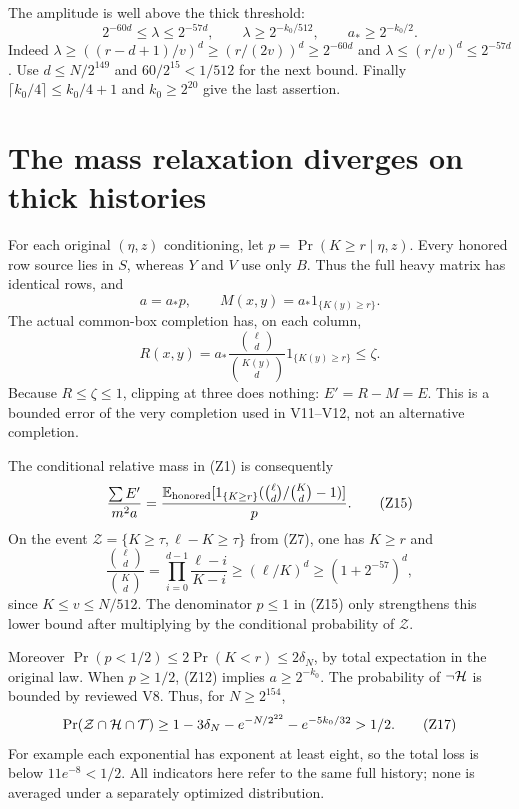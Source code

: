 \documentclass[11pt]{article}
\newcommand{\E}{\mathbb E}
\begin{document}
The amplitude is well above the thick threshold:
\[
 2^{-60d}\le\lambda\le2^{-57d},\qquad
             \lambda\ge2^{-k_0/512},\qquad
                              a_*\ge2^{-k_0/2}.          \tag{Z12}
\]
Indeed
$\lambda\ge((r-d+1)/v)^d\ge(r/(2v))^d\ge2^{-60d}$ and
$\lambda\le(r/v)^d\le2^{-57d}$.
Use $d\le N/2^{149}$ and $60/2^{15}<1/512$ for the next bound.
Finally $\lceil k_0/4\rceil\le k_0/4+1$ and $k_0\ge2^{20}$
give the last assertion.

\section{The mass relaxation diverges on thick histories}
For each original $(\eta,z)$ conditioning, let
$p=\Pr(K\ge r\mid\eta,z)$.
Every honored row source lies in $S$, whereas $Y$ and $V$ use
only $B$. Thus the full heavy matrix has identical rows, and
\[
                    a=a_*p,\qquad
 M(x,y)=a_*1_{\{K(y)\ge r\}}.                            \tag{Z13}
\]
The actual common-box completion has, on each column,
\[
 R(x,y)=a_*\frac{\binom\ell d}{\binom{K(y)}d}
                           1_{\{K(y)\ge r\}}\le\zeta .
                                                               \tag{Z14}
\]
Because $R\le\zeta\le1$, clipping at three does nothing:
$E'=R-M=E$. This is a bounded error of the very completion
used in V11--V12, not an alternative completion.

The conditional relative mass in (Z1) is consequently
\[
 \frac{\sum E'}{m^2a}
 =\frac{\E_{\rm honored}
    [1_{\{K\ge r\}}(\binom\ell d/\binom Kd-1)]}{p}.
                                                               \tag{Z15}
\]
On the event $\mathcal Z=\{K\ge\tau,\ell-K\ge\tau\}$ from (Z7),
one has $K\ge r$ and
\[
 \frac{\binom\ell d}{\binom Kd}
  =\prod_{i=0}^{d-1}\frac{\ell-i}{K-i}
  \ge(\ell/K)^d
  \ge(1+2^{-57})^d ,
                                                               \tag{Z16}
\]
since $K\le v\le N/512$.
The denominator $p\le1$ in (Z15) only strengthens this lower bound
after multiplying by the conditional probability of $\mathcal Z$.

Moreover $\Pr(p<1/2)\le2\Pr(K<r)\le2\delta_N$, by total
expectation in the original law. When $p\ge1/2$, (Z12) implies
$a\ge2^{-k_0}$.
The probability of $\neg{\cal H}$ is bounded by reviewed V8.
Thus, for $N\ge2^{154}$,
\[
 \Pr(\mathcal Z\cap{\cal H}\cap{\cal T})
 \ge1-3\delta_N-e^{-N/2^{22}}-e^{-5k_0/32}>1/2 .
                                                               \tag{Z17}
\]
For example each exponential has exponent at least eight, so
the total loss is below $11e^{-8}<1/2$.
All indicators here refer to the same full history;
none is averaged under a separately optimized distribution.
\end{document}
